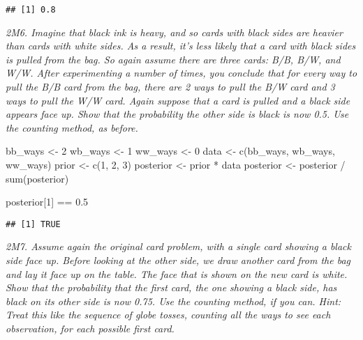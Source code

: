 \documentclass[
]{book}
\newenvironment{Shaded}{\begin{snugshade}}{\end{snugshade}}
\newcommand{\DecValTok}[1]{\textcolor[rgb]{0.00,0.00,0.81}{#1}}
\newcommand{\FloatTok}[1]{\textcolor[rgb]{0.00,0.00,0.81}{#1}}
\newcommand{\FunctionTok}[1]{\textcolor[rgb]{0.00,0.00,0.00}{#1}}
\newcommand{\NormalTok}[1]{#1}
\newcommand{\OtherTok}[1]{\textcolor[rgb]{0.56,0.35,0.01}{#1}}
\newcommand{\SpecialCharTok}[1]{\textcolor[rgb]{0.00,0.00,0.00}{#1}}
\begin{document}
\begin{verbatim}
## [1] 0.8
\end{verbatim}

\emph{2M6. Imagine that black ink is heavy, and so cards with black sides are heavier than cards with white sides. As a result, it's less likely that a card with black sides is pulled from the bag. So again assume there are three cards: B/B, B/W, and W/W. After experimenting a number of times, you conclude that for every way to pull the B/B card from the bag, there are 2 ways to pull the B/W card and 3 ways to pull the W/W card. Again suppose that a card is pulled and a black side appears face up. Show that the probability the other side is black is now 0.5. Use the counting method, as before.}

\begin{Shaded}
\begin{Highlighting}[]
\NormalTok{bb\_ways }\OtherTok{\textless{}{-}} \DecValTok{2}
\NormalTok{wb\_ways }\OtherTok{\textless{}{-}} \DecValTok{1}
\NormalTok{ww\_ways }\OtherTok{\textless{}{-}} \DecValTok{0}
\NormalTok{data }\OtherTok{\textless{}{-}} \FunctionTok{c}\NormalTok{(bb\_ways, wb\_ways, ww\_ways)}
\NormalTok{prior }\OtherTok{\textless{}{-}} \FunctionTok{c}\NormalTok{(}\DecValTok{1}\NormalTok{, }\DecValTok{2}\NormalTok{, }\DecValTok{3}\NormalTok{)}
\NormalTok{posterior }\OtherTok{\textless{}{-}}\NormalTok{ prior }\SpecialCharTok{*}\NormalTok{ data}
\NormalTok{posterior }\OtherTok{\textless{}{-}}\NormalTok{ posterior }\SpecialCharTok{/} \FunctionTok{sum}\NormalTok{(posterior)}

\NormalTok{posterior[}\DecValTok{1}\NormalTok{] }\SpecialCharTok{==} \FloatTok{0.5}
\end{Highlighting}
\end{Shaded}

\begin{verbatim}
## [1] TRUE
\end{verbatim}

\emph{2M7. Assume again the original card problem, with a single card showing a black side face up. Before looking at the other side, we draw another card from the bag and lay it face up on the table. The face that is shown on the new card is white. Show that the probability that the first card, the one showing a black side, has black on its other side is now 0.75. Use the counting method, if you can. Hint: Treat this like the sequence of globe tosses, counting all the ways to see each observation, for each possible first card.}
\end{document}
